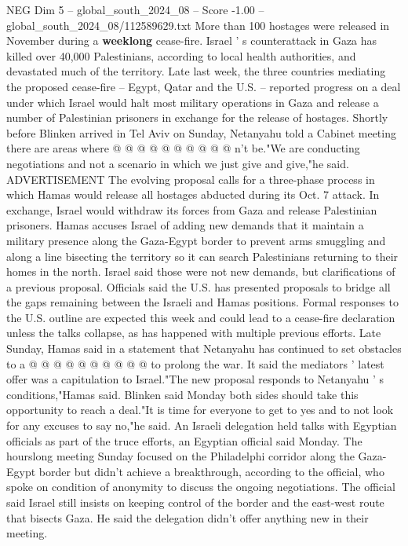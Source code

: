 \begin{textsample}{NEG Dim 5 – global\_south\_2024\_08 – Score -1.00 – global\_south\_2024\_08/112589629.txt}
More than 100 hostages were released in November during a \textbf{weeklong} cease-fire.
Israel ' s counterattack in Gaza has killed over 40,000 Palestinians, according to local health authorities, and devastated much of the territory.
Late last week, the three countries mediating the proposed cease-fire -- Egypt, Qatar and the U.S. -- reported progress on a deal under which Israel would halt most military operations in Gaza and release a number of Palestinian prisoners in exchange for the release of hostages.
Shortly before Blinken arrived in Tel Aviv on Sunday, Netanyahu told a Cabinet meeting there are areas where @ @ @ @ @ @ @ @ @ @ n't be."We are conducting negotiations and not a scenario in which we just give and give,"he said.
ADVERTISEMENT The evolving proposal calls for a three-phase process in which Hamas would release all hostages abducted during its Oct. 7 attack.
In exchange, Israel would withdraw its forces from Gaza and release Palestinian prisoners.
Hamas accuses Israel of adding new demands that it maintain a military presence along the Gaza-Egypt border to prevent arms smuggling and along a line bisecting the territory so it can search Palestinians returning to their homes in the north.
Israel said those were not new demands, but clarifications of a previous proposal.
Officials said the U.S. has presented proposals to bridge all the gaps remaining between the Israeli and Hamas positions.
Formal responses to the U.S. outline are expected this week and could lead to a cease-fire declaration unless the talks collapse, as has happened with multiple previous efforts.
Late Sunday, Hamas said in a statement that Netanyahu has continued to set obstacles to a @ @ @ @ @ @ @ @ @ @ to prolong the war.
It said the mediators ' latest offer was a capitulation to Israel."The new proposal responds to Netanyahu ' s conditions,"Hamas said.
Blinken said Monday both sides should take this opportunity to reach a deal."It is time for everyone to get to yes and to not look for any excuses to say no,"he said.
An Israeli delegation held talks with Egyptian officials as part of the truce efforts, an Egyptian official said Monday.
The hourslong meeting Sunday focused on the Philadelphi corridor along the Gaza-Egypt border but didn't achieve a breakthrough, according to the official, who spoke on condition of anonymity to discuss the ongoing negotiations.
The official said Israel still insists on keeping control of the border and the east-west route that bisects Gaza.
He said the delegation didn't offer anything new in their meeting.

\end{textsample}
